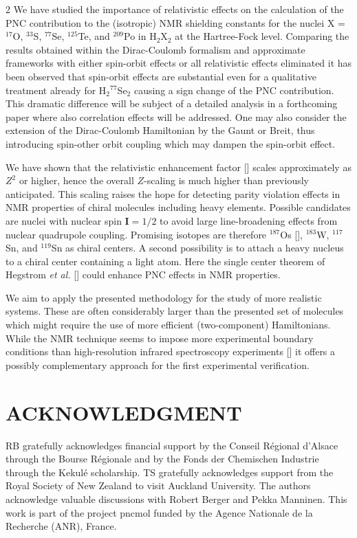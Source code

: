 \documentclass[a4paper,12pt,english]{article}
\begin{document}
\begin{spacing}{2}
\noindent We have studied the importance of relativistic effects on the calculation of the PNC contribution to the (isotropic) NMR shielding constants for the nuclei X = $^{17}$O, $^{33}$S, $^{77}$Se, $^{125}$Te, and $^{209}$Po in H$_2$X$_2$ at the Hartree-Fock level. Comparing the results obtained within the Dirac-Coulomb formalism and approximate frameworks with either spin-orbit effects or all relativistic effects eliminated it has been observed that spin-orbit effects are substantial even for a qualitative treatment already for H$_2{^{77}}$Se$_2$ causing a sign change of the PNC contribution. This dramatic difference will be subject of a detailed analysis in a forthcoming paper where also correlation effects will be addressed. One may also consider the extension of the Dirac-Coulomb Hamiltonian by the Gaunt or Breit, thus introducing spin-other
orbit coupling which may dampen the spin-orbit effect.

\par We have shown that the relativistic enhancement factor [\cite{bouchiatPL1974,bouchiatJP1974}] scales
approximately as $Z^2$ or higher, hence the overall $Z$-scaling is much higher than
previously anticipated. This scaling raises the hope for detecting parity violation
effects in NMR properties of chiral molecules including heavy elements.
Possible candidates are nuclei with nuclear spin $\mathbf{I} = 1/2$ to avoid large
line-broadening effects from nuclear quadrupole coupling. Promising isotopes are therefore
$^{187}$Os [\cite{benn}], $^{183}$W, $^{117}$Sn, and $^{119}$Sn as chiral centers. A second possibility
is to attach a heavy nucleus to a chiral center containing a light atom.
Here the single center theorem of Hegstrom \emph{et al.} [\cite{hegstrom}] could enhance PNC effects in NMR properties.

\par We aim to apply the presented methodology for the study of more realistic systems. These are often considerably larger than the presented set of molecules which might require the use of more efficient (two-component) Hamiltonians. While the NMR technique seems to impose more experimental boundary conditions than high-resolution infrared spectroscopy experiments [\cite{barra2001chirality}] it offers a possibly complementary approach for the first experimental verification.
\section{ACKNOWLEDGMENT}

RB gratefully acknowledges financial support by the Conseil R\'egional d'Alsace through the Bourse R\'egionale and by the Fonds der Chemischen Industrie through the Kekul\'e scholarship. TS gratefully acknowledges support from the Royal Society of New Zealand to visit Auckland University. The authors acknowledge valuable discussions with Robert Berger and Pekka Manninen. This work is part of the project {\sc pncmol} funded by the Agence 
Nationale de la Recherche (ANR), France.
\end{spacing}
\end{document}
